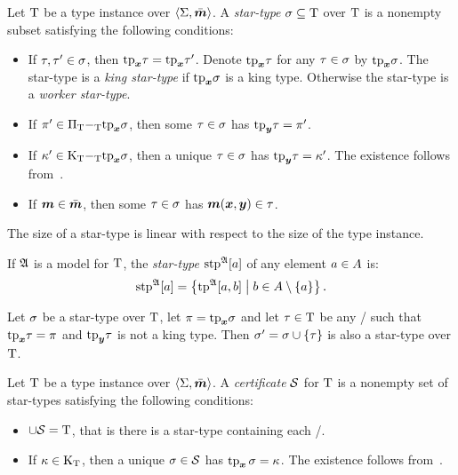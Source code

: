 \begin{definition}
Let $\mathrm{T}$ be a type instance over $\left\langle \mathrm{\Sigma},\bar{\bm{m}} \right\rangle$.
A \emph{star-type} $\sigma \subseteq \mathrm{T}$ over $\mathrm{T}$ is a nonempty
subset satisfying the following conditions:
\begin{itemize}
  \item[\condstpx]\label{cond:stpx}
  If $\tau, {\tau'} \in \sigma$, then $\mathrm{tp}_{\bm{x}}\tau = \mathrm{tp}_{\bm{x}}{\tau'}$.
  Denote $\mathrm{tp}_{\bm{x}}\tau$ for any $\tau \in \sigma$ by $\mathrm{tp}_{\bm{x}}\sigma$.
  The star-type is a \emph{king star-type} if $\mathrm{tp}_{\bm{x}}\sigma$ is a king type.
  Otherwise the star-type is a \emph{worker star-type}.
  
  \item[\condstppy]\label{cond:stppy}
  If ${\pi'} \in {\Pi}_{\mathrm{T}} {-}_{\mathrm{T}} \mathrm{tp}_{\bm{x}}\sigma$, then some $\tau\in\sigma$ has
  $\mathrm{tp}_{\bm{y}}\tau = {\pi'}$.
  
  \item[\condstpky]\label{cond:stpky}
  If ${\kappa'} \in {\mathrm{K}}_{\mathrm{T}} {-}_{\mathrm{T}} \mathrm{tp}_{\bm{x}}\sigma$, then a unique $\tau\in\sigma$ has
  $\mathrm{tp}_{\bm{y}}\tau = {\kappa'}$. The existence follows from~.
  
  \item[\condstpm]\label{cond:stpm}
  If $\bm{m} \in \bar{\bm{m}}$, then some $\tau\in\sigma$ has $\bm{m}(\bm{x},\bm{y}) \in \tau$.
\end{itemize}
The size of a star-type is linear with respect to the size of the type instance.
\end{definition}

If $\mathfrak{A}$ is a model for $\mathrm{T}$, the \emph{star-type}
$\operatorname{stp}^{\mathfrak{A}}[a]$ of any element $a \in A$ is:
\[
  \operatorname{stp}^{\mathfrak{A}}[a] = \left\{\operatorname{tp}^{\mathfrak{A}}[a,b]\mathrel{}\middle|\mathrel{}b \in A \setminus \left\{a\right\}\right\}.
\]

\begin{remark}\label{rem:star-type-ext}
Let $\sigma$ be a star-type over $\mathrm{T}$, let $\pi = \mathrm{tp}_{\bm{x}}\sigma$ and let
$\tau \in \mathrm{T}$ be any \twotype/ such that $\mathrm{tp}_{\bm{x}}\tau = \pi$ and
$\mathrm{tp}_{\bm{y}}\tau$ is not a king type.
Then ${\sigma'} = \sigma \cup \left\{\tau\right\}$ is also a star-type over $\mathrm{T}$.
\end{remark}

\begin{definition}
Let $\mathrm{T}$ be a type instance over $\left\langle \mathrm{\Sigma},\bar{\bm{m}} \right\rangle$.
A \emph{certificate} $\mathcal{S}$ for $\mathrm{T}$ is a nonempty set of star-types
satisfying the following conditions:
\begin{itemize}
  \item[\condcertT]\label{cond:certT}
  $\cup\mathcal{S} = \mathrm{T}$, that is there is a star-type containing each \twotype/.
  
  \item[\condcertk]\label{cond:certk}
  If $\kappa \in {\mathrm{K}}_{\mathrm{T}}$, then a unique $\sigma\in\mathcal{S}$ has $\operatorname{tp}_{\bm{x}}\sigma = \kappa$.
  The existence follows from~.
\end{itemize}
\end{definition}

